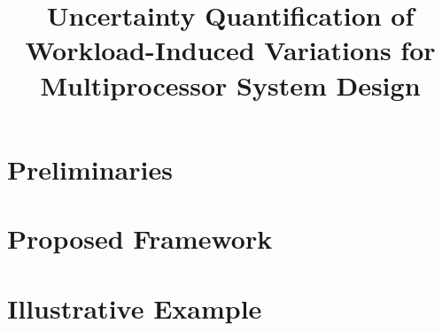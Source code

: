 \documentclass{sig-alternate}
\begin{document}
  \title{Uncertainty Quantification of Workload-Induced Variations for Multiprocessor System Design}

  \maketitle

  \begin{abstract}
    
  \end{abstract}

  \section{Preliminaries}
  

  \section{Proposed Framework}
  

  \section{Illustrative Example}
  

  \printbibliography
\end{document}
